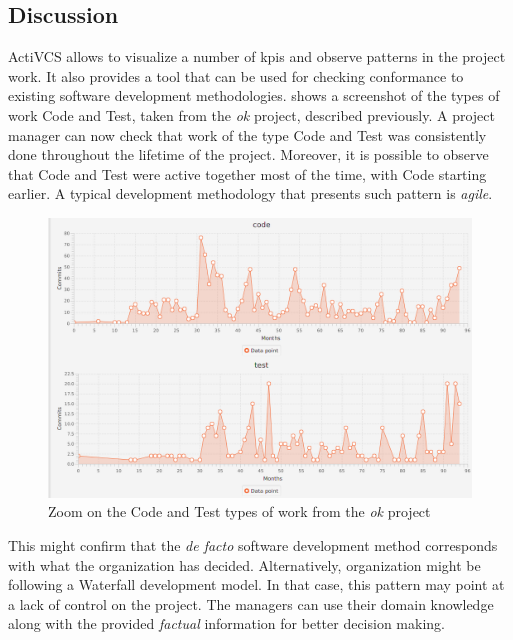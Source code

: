 \subsection{Discussion}
\label{sec:discussion}

ActiVCS allows to visualize a number of \glspl{kpi} and observe patterns in the project work. It also provides a tool that can be used for checking conformance to existing software development methodologies. 
 shows a screenshot of the types of work Code and Test, taken from the \textsl{ok} project, described previously. A project manager can now check that work of the type Code and Test was consistently done throughout the lifetime of the project. Moreover, it is possible to observe that Code and Test were active together most of the time, with Code starting earlier. A typical development methodology that presents such pattern is \emph{agile}. 
\begin{figure}[]
    \centering
    \includegraphics[width=.8\textwidth]{figures/ok-code-test}
    \caption{Zoom on the Code and Test types of work from the \textsl{ok} project}
    \label{fig:zoom}
\end{figure}


This might confirm that the \textsl{de facto} software development method corresponds with what the organization has decided. Alternatively, organization might be following a Waterfall development model. In that case, this pattern may point at a lack of control on the project. The managers can use their domain knowledge along with the provided \emph{factual} information for better decision making.



